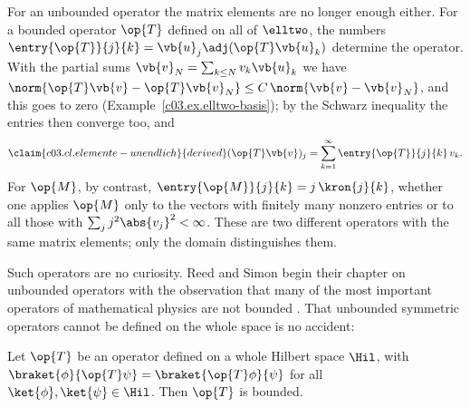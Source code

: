 \begin{vertiefung}
  For an unbounded operator the matrix elements are no longer enough either. For a bounded
  operator $\op{T}$ defined on all of $\elltwo$, the numbers
  $\entry{\op{T}}{j}{k} = \vb{u}_j\adj (\op{T}\vb{u}_k)$ determine the operator. With the partial
  sums $\vb{v}_N = \sum_{k \leq N} v_k \vb{u}_k$ we have
  $\norm{\op{T}\vb{v} - \op{T}\vb{v}_N} \leq C\, \norm{\vb{v} - \vb{v}_N}$, and this goes to
  zero (Example~\ref{c03.ex.elltwo-basis}); by the Schwarz inequality the entries then converge
  too, and
  \begin{equation}\label{c03.eq.elemente-unendlich}\claim{c03.cl.elemente-unendlich}{derived}
    (\op{T}\vb{v})_j = \sum_{k=1}^{\infty} \entry{\op{T}}{j}{k}\, v_k .
  \end{equation}
  For $\op{M}$, by contrast, $\entry{\op{M}}{j}{k} = j\, \kron{j}{k}$, whether one applies
  $\op{M}$ only to the vectors with finitely many nonzero entries or to all those with
  $\sum_j j^2 \abs{v_j}^2 < \infty$. These are two different operators with the same matrix
  elements; only the domain distinguishes them.

  Such operators are no curiosity. Reed and Simon begin their chapter on unbounded operators
  with the observation that many of the most important operators of mathematical physics are
  not bounded . That unbounded symmetric operators cannot be
  defined on the whole space is no accident:

  \begin{theorem}\label{c03.thm.hellinger-toeplitz}
    Let $\op{T}$ be an operator defined on a whole Hilbert space $\Hil$, with
    $\braket{\phi}{\op{T}\psi} = \braket{\op{T}\phi}{\psi}$ for all
    $\ket{\phi}, \ket{\psi} \in \Hil$. Then $\op{T}$ is bounded.
  \end{theorem}


\end{vertiefung}

